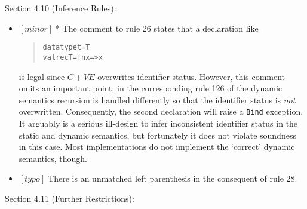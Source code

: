 \documentclass{article}
\newcommand{\m}[1]{$[\mathit{#1}]\;$}
\newcommand{\minor}{\m{minor}}
\newcommand{\pedantic}{\m{pedantic}}
\newcommand{\typo}{\m{typo}}
\newcommand{\void}[1]{}
\begin{document}
Section 4.10 (Inference Rules):
\nopagebreak

\begin{itemize}
\item \minor * The comment to rule 26 states that a declaration like
\begin{quote}
\begin{alltt}
datatype t = T
val rec T = fn x => x
\end{alltt}
\end{quote}
is legal since $C+\mathit{VE}$ overwrites identifier status. However, this comment omits an important point: in the corresponding rule 126 of the dynamic semantics recursion is handled differently so that the identifier status is {\em not} overwritten. Consequently, the second declaration will raise a {\tt Bind} exception. It arguably is a serious ill-design to infer inconsistent identifier status in the static and dynamic semantics, but fortunately it does not violate soundness in this case. Most implementations do not implement the `correct' dynamic semantics, though.

\item \typo There is an unmatched left parenthesis in the consequent of rule 28.

\void{
\item \pedantic As an artefact of the treatment of type name generativity in the inference rules, the following expression is ill-typed according to the Definition \cite{mistakes}:
\begin{quote}
\begin{alltt}
let
    val r = ref NONE
    datatype t = C
in
    r := SOME C
end
\end{alltt}
\end{quote}
This behaviour is very tedious to implement and there is no real argument for forbidding such examples. Consequently, all SML implementation seem to allow it. Fixing this in favour of a more ``natural'' implementation of generativity would require getting rid of $\oplus$ composition and infer type name sets explicitly.
}
\end{itemize}


Section 4.11 (Further Restrictions):
\nopagebreak
\end{document}
